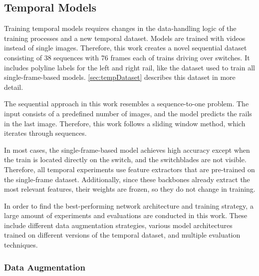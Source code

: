 \subsection{Temporal Models}

Training temporal models requires changes in the data-handling logic of the training processes and a new temporal dataset.
Models are trained with videos instead of single images.
Therefore, this work creates a novel sequential dataset consisting of 38 sequences with 76 frames each of trains driving over switches.
It includes polyline labels for the left and right rail, like the dataset used to train all single-frame-based models.
\autoref{sec:tempDataset} describes this dataset in more detail.

The sequential approach in this work resembles a sequence-to-one problem.
The input consists of a predefined number of images, and the model predicts the rails in the last image.
Therefore, this work follows a sliding window method, which iterates through sequences.

In most cases, the single-frame-based model achieves high accuracy except when the train is located directly on the switch, and the switchblades are not visible.
Therefore, all temporal experiments use feature extractors that are pre-trained on the single-frame dataset.
Additionally, since these backbones already extract the most relevant features, their weights are frozen, so they do not change in training.

In order to find the best-performing network architecture and training strategy, a large amount of experiments and evaluations are conducted in this work.
These include different data augmentation strategies, various model architectures trained on different versions of the temporal dataset, and multiple evaluation techniques.

\subsubsection{Data Augmentation}

